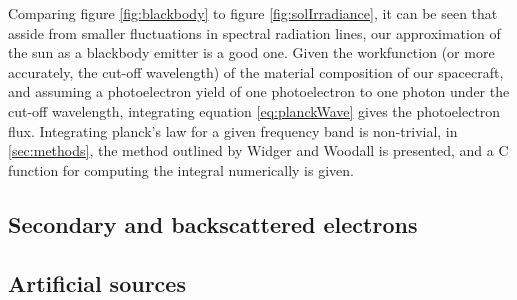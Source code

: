 \newpage

Comparing figure \ref{fig:blackbody} to figure \ref{fig:solIrradiance}, it can be seen that asside from smaller fluctuations in spectral radiation lines, our approximation of the sun as a blackbody emitter is a good one. Given the workfunction (or more accurately, the cut-off wavelength) of the material composition of our spacecraft, and assuming a photoelectron yield of one photoelectron to one photon under the cut-off wavelength, integrating equation \ref{eq:planckWave} gives the photoelectron flux. Integrating planck's law for a given frequency band is non-trivial, in \ref{sec:methods}, the method outlined by Widger and Woodall  is presented, and a C function for computing the integral numerically is given. 





\subsection*{Secondary and backscattered electrons}

\subsection*{Artificial sources}
